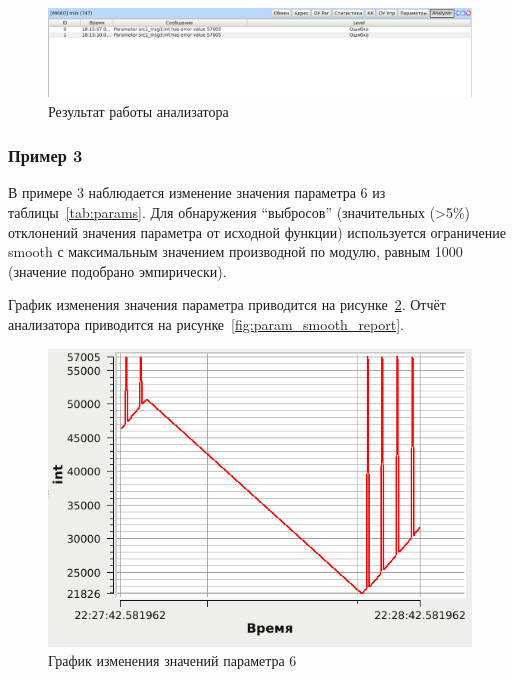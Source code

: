 \begin{figure}[H]
 \centering
 \includegraphics[scale=0.4]{tests/param_error_value/report}
 \caption{Результат работы анализатора}
 \label{fig:param_error_value_report}
\end{figure}

\subsubsection{Пример 3}

В примере 3 наблюдается изменение значения параметра 6 из 
таблицы~\ref{tab:params}. Для обнаружения ``выбросов'' (значительных (>5\%)
отклонений значения параметра от исходной функции) используется ограничение 
smooth с максимальным значением производной по модулю, равным 1000 (значение 
подобрано эмпирически).

График изменения значения параметра 
приводится на рисунке~\ref{fig:param_smooth_graph}. Отчёт анализатора 
приводится на рисунке~\ref{fig:param_smooth_report}.



\begin{figure}[H]
 \centering
 \includegraphics[scale=0.6]{tests/param_smooth/graph}
 \caption{График изменения значений параметра 6}
 \label{fig:param_smooth_graph}
\end{figure}

